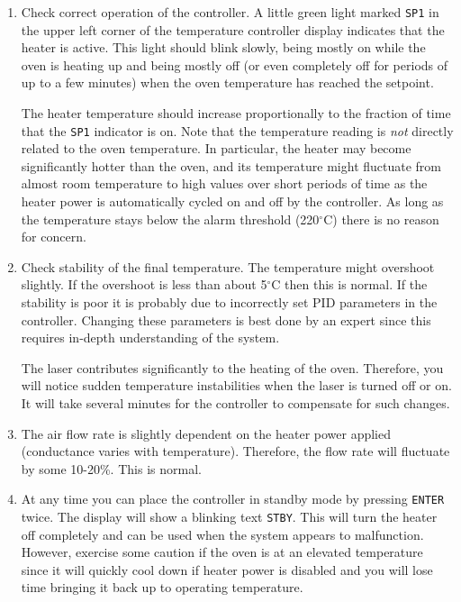 {\begin{enumerate}
\item Check correct operation of the controller. A little green 
  light marked {\tt SP1} in the upper left corner of the 
  temperature controller display indicates that the heater is active.
  This light should blink slowly, being mostly on while the oven is heating
  up and being mostly off (or even completely off for periods of up
  to a few minutes) when the oven temperature has reached the setpoint.

  The heater temperature should increase proportionally to the
  fraction of time that the {\tt SP1} indicator is on. 
  Note that the temperature reading is {\it not} directly related to the
  oven temperature. In particular, the heater may become significantly
  hotter than the oven, and its temperature 
  might fluctuate from almost room temperature
  to high values over short periods of time as the heater 
  power is automatically
  cycled on and off by the controller.  As long as the temperature 
  stays below the alarm threshold (220$^\circ$C) there is no reason 
  for concern.

\item Check stability of the final temperature. 
  The temperature might overshoot slightly. If the overshoot is
  less than about 5$^\circ$C then this is normal. If the stability is
  poor it is probably due to incorrectly set PID parameters in the controller. 
  Changing these parameters is best done by an expert since this requires
  in-depth understanding of the system.

  The laser contributes significantly to the heating of the oven.
  Therefore, you will notice sudden temperature instabilities when
  the laser is turned off or on. It will take several minutes for
  the controller to compensate for such changes.

\item The air flow rate is slightly dependent on the heater power
  applied (conductance varies with temperature). 
  Therefore, the flow rate will fluctuate by some 10-20\%. This is
  normal.


\item At any time you can place the controller in standby mode by pressing
  {\tt ENTER} twice. The display will show a blinking text {\tt STBY}.
  This will turn the heater off completely and can be used
  when the system appears to malfunction.   However, exercise some
  caution if the oven is at an elevated temperature since it will quickly 
  cool down if heater power is disabled and you will lose time bringing
  it back up to operating temperature.


\end{enumerate}}
